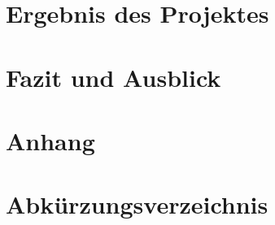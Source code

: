 \documentclass[ngerman]{scrartcl} %
\begin{document}
\newpage

\section{Ergebnis des Projektes}        
\label{sec:Ergebnis des Projektes-1}  

\newpage

\section{Fazit und Ausblick}        
\label{sec:Fazit und Ausblick-1}  

\newpage

\section{Anhang}        
\label{sec:Anhang-1}  



\newpage

\section{Abkürzungsverzeichnis}
\label{sec:Abkürzungsverzeichnis}



\newpage


  


\newpage


\listoffigures

\newpage
\end{document}
